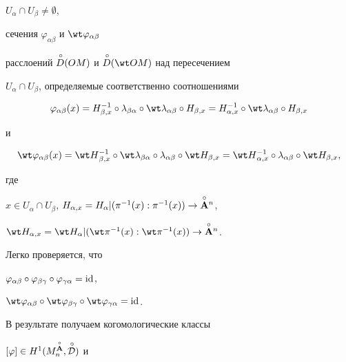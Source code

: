 $U_\alpha\cap U_\beta\ne\emptyset$,


сечения $\varphi_{\alpha\beta}$ и $\wt\varphi_{\alpha\beta}$


расслоений ${\overset{\,\circ}{D}{}}(OM)$ и ${\puto D}(\wt OM)$ над пересечением


$U_\alpha\cap U_\beta$, определяемые соответственно соотношениями


\begin{equation}


\label{n.4}


\varphi_{\alpha\beta}(x) = H_{\beta,x}^{-1} \circ


\lambda_{\beta\alpha} \circ \wt\lambda_{\alpha\beta}


\circ H_{\beta,x} = H_{\alpha,x}^{-1} \circ


\wt\lambda_{\alpha\beta} \circ H_{\beta,x}


\end{equation}


и


\begin{equation}


\label{n.5}


\wt\varphi_{\alpha\beta} (x) = \wt H{}_{\beta,x}^{-1}


\circ \wt\lambda_{\beta\alpha} \circ \lambda_{\alpha\beta}


\circ \wt H_{\beta,x} = \wt H{}_{\alpha,x}^{-1}


\circ \lambda_{\alpha\beta}\circ \wt H_{\beta,x},


\end{equation}


где


$x\in U_\alpha\cap U_\beta$, $H_{\alpha,x}=


H_\alpha | (\pi^{-1}(x) : \pi^{-1} (x)) \to \Aon$,


$\wt H_{\alpha,x} = \wt H_\alpha |


(\wt\pi{}^{-1}(x) : \wt\pi{}^{-1} (x)) \to \Aon$.


Легко проверяется, что


$\varphi_{\alpha\beta} \circ \varphi_{\beta\gamma}


\circ \varphi_{\gamma\alpha}=\id$,


$\wt\varphi_{\alpha\beta} \circ \wt\varphi_{\beta\gamma}


\circ \wt\varphi_{\gamma\alpha}=\id$.


В результате получаем когомологические классы


$[\varphi]\in H^1(M^{\overset{\circ}{\bold A}{}}_n,\overset{\,\circ}{\cal D}{})$ и


